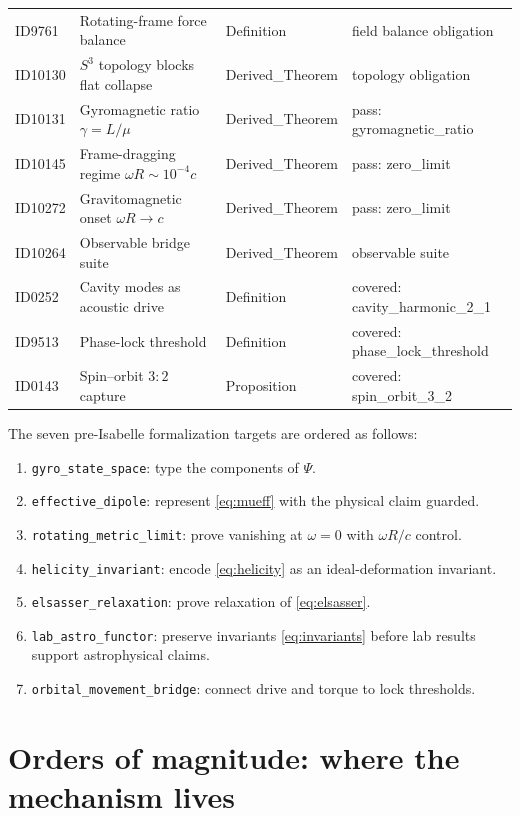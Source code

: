 \documentclass[11pt]{article}
\theoremstyle{remark}
\begin{document}
\begin{table}[ht]
\begin{tabular}{llll}
ID9761 & Rotating-frame force balance & Definition & field balance obligation \\
ID10130 & $S^3$ topology blocks flat collapse & Derived\_Theorem & topology obligation \\
ID10131 & Gyromagnetic ratio $\gamma = L/\mu$ & Derived\_Theorem & pass: gyromagnetic\_ratio \\
ID10145 & Frame-dragging regime $\omega R \sim 10^{-4}c$ & Derived\_Theorem & pass: zero\_limit \\
ID10272 & Gravitomagnetic onset $\omega R \to c$ & Derived\_Theorem & pass: zero\_limit \\
ID10264 & Observable bridge suite & Derived\_Theorem & observable suite \\
ID0252 & Cavity modes as acoustic drive & Definition & covered: cavity\_harmonic\_2\_1 \\
ID9513 & Phase-lock threshold & Definition & covered: phase\_lock\_threshold \\
ID0143 & Spin--orbit $3{:}2$ capture & Proposition & covered: spin\_orbit\_3\_2 \\
\bottomrule
\end{tabular}
\end{table}

The seven pre-Isabelle formalization targets are ordered as follows:
\begin{enumerate}
\item \texttt{gyro\_state\_space}: type the components of $\Psi$.
\item \texttt{effective\_dipole}: represent \eqref{eq:mueff} with the physical claim guarded.
\item \texttt{rotating\_metric\_limit}: prove vanishing at $\omega = 0$ with $\omega R/c$ control.
\item \texttt{helicity\_invariant}: encode \eqref{eq:helicity} as an ideal-deformation invariant.
\item \texttt{elsasser\_relaxation}: prove relaxation of \eqref{eq:elsasser}.
\item \texttt{lab\_astro\_functor}: preserve invariants \eqref{eq:invariants} before lab results support astrophysical claims.
\item \texttt{orbital\_movement\_bridge}: connect drive and torque to lock thresholds.
\end{enumerate}

\section{Orders of magnitude: where the mechanism lives}
\label{sec:orders}
\end{document}
